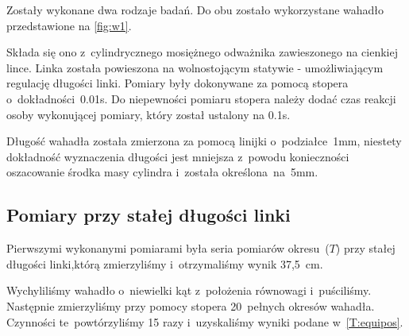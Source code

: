 \documentclass{fizraport}
\begin{document}
Zostały wykonane dwa rodzaje badań. Do obu zostało wykorzystane wahadło przedstawione na \figurename{\ref{fig:w1}}.

Składa się ono z~cylindrycznego mosiężnego odważnika zawieszonego na cienkiej lince. Linka została powieszona na wolnostojącym statywie - umożliwiającym regulację długości linki.
Pomiary były dokonywane za pomocą stopera o~dokładności~0.01s. Do niepewności pomiaru stopera należy dodać czas reakcji osoby wykonującej pomiary, który został ustalony na 0.1s.

Długość wahadła została zmierzona za pomocą linijki o~podziałce~1mm, niestety dokładność wyznaczenia długości jest mniejsza z~powodu konieczności oszacowanie środka masy cylindra i~została określona~na~5mm.


\subsection{Pomiary przy stałej długości linki}
Pierwszymi wykonanymi pomiarami była seria pomiarów okresu~($T$) przy stałej długości linki,którą zmierzyliśmy i~otrzymaliśmy wynik 37,5~cm. 

Wychyliliśmy wahadło o~niewielki kąt z~położenia równowagi i~puściliśmy. Następnie zmierzyliśmy przy pomocy stopera 20~pełnych okresów wahadła. Czynności te~powtórzyliśmy 15 razy i~uzyskaliśmy wyniki podane w~\tablename{\ref{T:equipos}}. 
\end{document}
